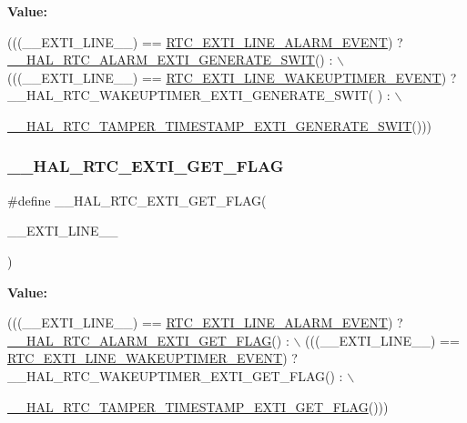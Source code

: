 {\bfseries Value\+:}
\begin{DoxyCode}
(((\_\_EXTI\_LINE\_\_) == \hyperlink{group___r_t_c___private___constants_gaeffe9b89372b06df1c0eff2f4346682b}{RTC\_EXTI\_LINE\_ALARM\_EVENT}) ? 
      \hyperlink{group___r_t_c___exported___macros_ga0ea6a0ad763bcc1913468b57f3972cb2}{\_\_HAL\_RTC\_ALARM\_EXTI\_GENERATE\_SWIT}() : \(\backslash\)
                                                      (((\_\_EXTI\_LINE\_\_) == 
      \hyperlink{group___r_t_c_ex___private___constants_ga1a1a58e244663850786c387bfa5474f2}{RTC\_EXTI\_LINE\_WAKEUPTIMER\_EVENT}) ? \_\_HAL\_RTC\_WAKEUPTIMER\_EXTI\_GENERATE\_SWIT(
      ) :  \(\backslash\)
                                                          
      \hyperlink{group___r_t_c_ex___tamper___timestamp_ga0b97cc893176924af206e9501b00dc16}{\_\_HAL\_RTC\_TAMPER\_TIMESTAMP\_EXTI\_GENERATE\_SWIT}()))
\end{DoxyCode}
\mbox{\label{group___h_a_l___r_t_c___aliased___macros_ga7ff2ab63c65042a0a9ef683d345abf49}} 
\subsubsection{\texorpdfstring{\+\_\+\+\_\+\+H\+A\+L\+\_\+\+R\+T\+C\+\_\+\+E\+X\+T\+I\+\_\+\+G\+E\+T\+\_\+\+F\+L\+AG}{\_\_HAL\_RTC\_EXTI\_GET\_FLAG}}
{\footnotesize\ttfamily \#define \+\_\+\+\_\+\+H\+A\+L\+\_\+\+R\+T\+C\+\_\+\+E\+X\+T\+I\+\_\+\+G\+E\+T\+\_\+\+F\+L\+AG(\begin{DoxyParamCaption}\item[{}]{\+\_\+\+\_\+\+E\+X\+T\+I\+\_\+\+L\+I\+N\+E\+\_\+\+\_\+ }\end{DoxyParamCaption})}

{\bfseries Value\+:}
\begin{DoxyCode}
(((\_\_EXTI\_LINE\_\_) == \hyperlink{group___r_t_c___private___constants_gaeffe9b89372b06df1c0eff2f4346682b}{RTC\_EXTI\_LINE\_ALARM\_EVENT}) ? 
      \hyperlink{group___r_t_c___exported___macros_ga05c79b3e9c7563c449d6dcb1c4a426bc}{\_\_HAL\_RTC\_ALARM\_EXTI\_GET\_FLAG}() : \(\backslash\)
                                                  (((\_\_EXTI\_LINE\_\_) == 
      \hyperlink{group___r_t_c_ex___private___constants_ga1a1a58e244663850786c387bfa5474f2}{RTC\_EXTI\_LINE\_WAKEUPTIMER\_EVENT}) ? \_\_HAL\_RTC\_WAKEUPTIMER\_EXTI\_GET\_FLAG() : \(\backslash\)
                                                      
      \hyperlink{group___r_t_c_ex___tamper___timestamp_ga0bc632c4efb10afdba2356aac489b5b7}{\_\_HAL\_RTC\_TAMPER\_TIMESTAMP\_EXTI\_GET\_FLAG}()))
\end{DoxyCode}
